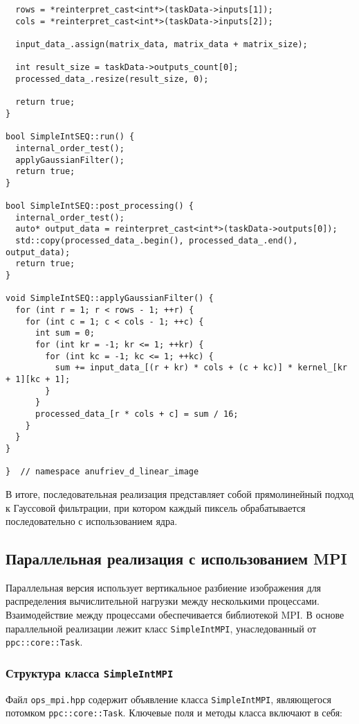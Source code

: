 \documentclass[12pt]{article}
\begin{document}
\begin{lstlisting}
  rows = *reinterpret_cast<int*>(taskData->inputs[1]);
  cols = *reinterpret_cast<int*>(taskData->inputs[2]);

  input_data_.assign(matrix_data, matrix_data + matrix_size);

  int result_size = taskData->outputs_count[0];
  processed_data_.resize(result_size, 0);

  return true;
}

bool SimpleIntSEQ::run() {
  internal_order_test();
  applyGaussianFilter();
  return true;
}

bool SimpleIntSEQ::post_processing() {
  internal_order_test();
  auto* output_data = reinterpret_cast<int*>(taskData->outputs[0]);
  std::copy(processed_data_.begin(), processed_data_.end(), output_data);
  return true;
}

void SimpleIntSEQ::applyGaussianFilter() {
  for (int r = 1; r < rows - 1; ++r) {
    for (int c = 1; c < cols - 1; ++c) {
      int sum = 0;
      for (int kr = -1; kr <= 1; ++kr) {
        for (int kc = -1; kc <= 1; ++kc) {
          sum += input_data_[(r + kr) * cols + (c + kc)] * kernel_[kr + 1][kc + 1];
        }
      }
      processed_data_[r * cols + c] = sum / 16;
    }
  }
}

}  // namespace anufriev_d_linear_image
\end{lstlisting}

В итоге, последовательная реализация представляет собой прямолинейный подход к Гауссовой фильтрации, при котором каждый пиксель обрабатывается последовательно с использованием ядра.

\subsection{Параллельная реализация с использованием MPI}

Параллельная версия использует вертикальное разбиение изображения для распределения вычислительной нагрузки между несколькими процессами. Взаимодействие между процессами обеспечивается библиотекой MPI. В основе параллельной реализации лежит класс \texttt{SimpleIntMPI}, унаследованный от \texttt{ppc::core::Task}.

\subsubsection{Структура класса \texttt{SimpleIntMPI}}

Файл \texttt{ops\_mpi.hpp} содержит объявление класса \texttt{SimpleIntMPI}, являющегося потомком \texttt{ppc::core::Task}. Ключевые поля и методы класса включают в себя:
\end{document}
